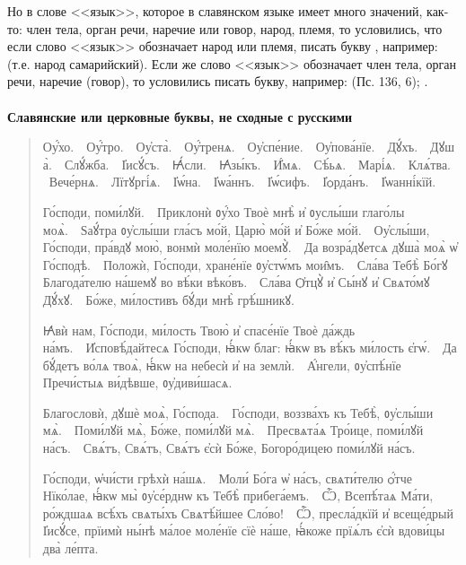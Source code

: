\documentclass[11pt,a4paper,oneside]{memoir}
\newcommand{\exercise}{}
\begin{document}
    Но в слове <<язык>>, которое в славянском языке имеет много значений, как-то: член тела, орган речи, наречие или говор, народ, племя, то условились, что если слово <<язык>> обозначает народ или племя, писать букву {}, например: {} (т.е. народ самарийский). Если же слово <<язык>> обозначает член тела, орган речи, наречие (говор), то условились писать букву{}, например: {} (Пс. 136, 6); {}.
    
                    \paragraph{\exercise}

    \textbf{Славянские или церковные буквы, не сходные с русскими}
    
    \begin{quote}\begin{slv}
        Оу҆́хо.~\textemdash~Оу҆́тро.~\textemdash~Оу҆ста̀.~\textemdash~Оу҆́тренѧ.~\textemdash~Оу҆спе́ние.~\textemdash~Оу҆пова́нїе.~\textemdash~Дꙋ́хъ.~\textemdash~Дꙋша̀.~\textemdash~Слꙋ́жба.~\textemdash~І҆исꙋ́съ.~\textemdash~Ꙗ҆́сли.~\textemdash~Ꙗ҆зы́къ.~\textemdash~И҆́мѧ.~\textemdash~Сѣ́ьѧ.~\textemdash~Марі́ѧ.~\textemdash~Клѧ́тва.~\textemdash~Вече́рнѧ.~\textemdash~Лїтꙋргі́ѧ.~\textemdash~І҆ѡ́на.~\textemdash~І҆ѡа́ннъ.~\textemdash~І҆ѡ́сифъ.~\textemdash~І҆ѻрда́нъ.~\textemdash~І҆ѡанні́кїй.
        
        Го́споди, поми́лꙋй.~\textemdash~Приклонѝ ᲂу҆́хо Твоѐ мнѣ̀ и҆ ᲂуслы́ши глаго́лы моѧ̀.~\textemdash~Ѕаꙋ́тра ᲂу҆слы́ши гла́съ мо́й, Царю̀ мо́й и҆ Бо́же мо́й.~\textemdash~Оу҆слы́ши, Го́споди, пра́вдꙋ мою̀, вонмѝ моле́нїю моемꙋ̀.~\textemdash~Да возра́дꙋетсѧ дꙋша̀ моѧ̀ ѡ҆ Го́сподѣ.~\textemdash~Положѝ, Го́споди, хране́нїе ᲂу҆стѡ́мъ мои̑мъ.~\textemdash~Сла́ва Тебѣ̀ Бо́гꙋ Благода́телю на́шемꙋ во вѣ́ки вѣко́въ.~\textemdash~Сла́ва Ѻ҆тцꙋ̀ и҆ Сы́нꙋ и҆ Свѧто́мꙋ Дꙋ́хꙋ.~\textemdash~Бо́же, ми́лостивъ бꙋ́ди мнѣ̀ грѣ́шникꙋ.
        
        Ꙗ҆вѝ нам, Го́споди, ми́лость Твою̀ и҆ спасе́нїе Твоѐ да́ждь на́мъ.~\textemdash~И҆сповѣ́дайтесѧ Го́споди, ꙗ҆́кѡ благ: ꙗ҆́кѡ въ вѣ́къ ми́лость є҆гѡ́.~\textemdash~Да бꙋ́детъ во́лѧ твоѧ̀, ꙗ҆́кѡ на небесѝ и҆ на землѝ.~\textemdash~А҆́нгели, ᲂу҆спѣ́нїе Пречи́стыѧ ви́дѣвше, ᲂу҆диви́шасѧ.
        
        Благословѝ, дꙋшѐ моѧ̀, Го́спода.~\textemdash~Го́споди, воззва́хъ къ Тебѣ̀, ᲂу҆слы́ши мѧ̀.~\textemdash~Поми́лꙋй мѧ̀, Бо́же, поми́лꙋй мѧ̀.~\textemdash~Пресвѧта́ѧ Тро́ице, поми́лꙋй на́съ.~\textemdash~Свѧ́тъ, Свѧ́тъ, Свѧ́тъ є҆сѝ Бо́же, Богоро́дицею поми́лꙋй на́съ.
        
        Го́споди, ѡ҆чи́сти грѣхѝ на́шѧ.~\textemdash~Моли́ Бо́га ѡ҆ на́съ, свѧти́телю ѻ҆́тче Нїко́лае, ꙗ҆́кѡ мы̀ ᲂу҆се́рднѡ къ Тебѣ̀ прибега́емъ.~\textemdash~Ѽ, Всепѣ́таѧ Ма́ти, ро́ждшаѧ всѣ́хъ свѧты́хъ Свѧтѣ́йшее Сло́во!~\textemdash~Ѽ, пресла́дкїй и҆ всеще́дрый І҆исꙋ́се, прїимѝ ны́нѣ ма́лое моле́нїе сїѐ на́ше, ꙗ҆́коже прїѧ́лъ є҆сѝ вдови́цы два̀ ле́пта.
    \end{slv}\end{quote}
\end{document}
